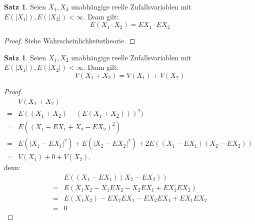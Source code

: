 \documentclass[a4paper,12pt,fleqn]{scrartcl}
\newcommand{\ZV}{Zufallsvariable}
\theoremstyle{definition}
\newtheorem{satz}[definition]{Satz}
\theoremstyle{plain}
\theoremstyle{remark}
\begin{document}
\begin{satz}
Seien $X_1,X_2$ unabhängige reelle \ZV n mit $E(|X_1|),E(|X_2|)<\infty$. Dann gilt:
\[E(X_1\cdot X_2)=EX_1\cdot EX_2\]
\end{satz}
\begin{proof}
Siehe Wahrscheinlichkeitstheorie.
\end{proof}
\begin{satz}
Seien $X_1,X_2$ unabhängige reelle \ZV n mit $E(|X_1|),E(|X_2|)<\infty$. Dann gilt:
\[V(X_1+X_2)=V(X_1)+V(X_2)\]
\end{satz}
\begin{proof}
\begin{align*}
&V(X_1+X_2)\\
=&E((X_1+X_2)-(E(X_1+X_2)))^2)\\
=&E((X_1-EX_1+X_2-EX_2)^2)\\
=&E(|X_1-EX_1|^2)+E(|X_2-EX_2|^2)+2E((X_1-EX_1)(X_2-EX_2))\\
=&V(X_1)+0+V(X_2),
\end{align*}
denn:
\begin{align*}
&E((X_1-EX_1)(X_2-EX_2))\\
=&E(X_1X_2-X_1EX_2-X_2EX_1+EX_1EX_2)\\
=&E(X_1X_2)-EX_2EX_1-EX_2EX_1+EX_1EX_2\\
=&0 \tag{Satz 5.34}
\end{align*}
\end{proof}
\end{document}
